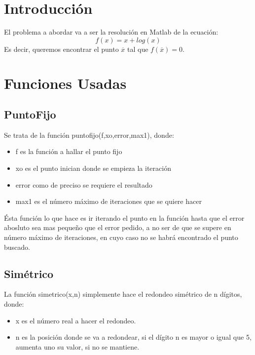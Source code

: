 \documentclass[a4paper]{article}
\title{}
\author{}
\date{}
\begin{document}
\maketitle

\tableofcontents
\clearpage

\section{Introducción}
El problema a abordar va a ser la resolución en Matlab de la ecuación:
\begin{equation}
f(x)=x+log(x)
\end{equation}
Es decir, queremos encontrar el punto $\overline{x}$ tal que $f(\overline{x})=0$.

\section{Funciones Usadas}
\subsection{PuntoFijo}
Se trata de la función puntofijo(f,xo,error,max1), donde:
\begin{itemize}
\item f es la función a hallar el punto fijo
\item xo es el punto inician donde se empieza la iteración
\item error como de preciso se requiere el resultado
\item max1 es el número máximo de iteraciones que se quiere hacer
\end{itemize}
Ésta función lo que hace es ir iterando el punto en la función hasta que el error abosluto sea mas pequeño que el error pedido, a no ser de que se supere en número máximo de iteraciones, en cuyo caso no se habrá encontrado el punto buscado.
\subsection{Simétrico}
La función simetrico(x,n) simplemente hace el redondeo simétrico de n dígitos, donde:
\begin{itemize}
\item x es el número real a hacer el redondeo.
\item n es la posición donde se va a redondear, si el dígito n es mayor o igual que 5, aumenta uno su valor, si no se mantiene.
\end{itemize}
\end{document}
